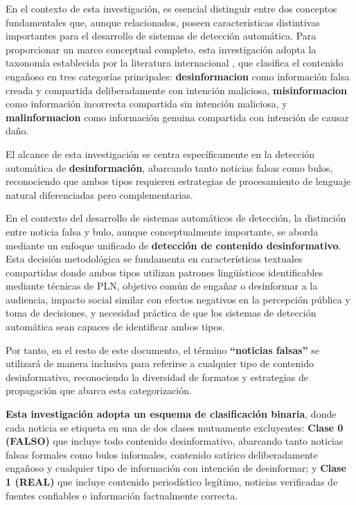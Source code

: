 En el contexto de esta investigación, es esencial distinguir entre dos conceptos fundamentales que, aunque relacionados, poseen características distintivas importantes para el desarrollo de sistemas de detección automática. Para proporcionar un marco conceptual completo, esta investigación adopta la taxonomía establecida por la literatura internacional \cite{bondielli2019survey, hu2022deep}, que clasifica el contenido engañoso en tres categorías principales: \textbf{\gls{desinformacion}} como información falsa creada y compartida deliberadamente con intención maliciosa, \textbf{\gls{misinformacion}} como información incorrecta compartida sin intención maliciosa, y \textbf{\gls{malinformacion}} como información genuina compartida con intención de causar daño.

El alcance de esta investigación se centra específicamente en la detección automática de \textbf{desinformación}, abarcando tanto noticias falsas como bulos, reconociendo que ambos tipos requieren estrategias de procesamiento de lenguaje natural diferenciadas pero complementarias.

En el contexto del desarrollo de sistemas automáticos de detección, la distinción entre noticia falsa y bulo, aunque conceptualmente importante, se aborda mediante un enfoque unificado de \textbf{detección de contenido desinformativo}. Esta decisión metodológica se fundamenta en características textuales compartidas donde ambos tipos utilizan patrones lingüísticos identificables mediante técnicas de PLN, objetivo común de engañar o desinformar a la audiencia, impacto social similar con efectos negativos en la percepción pública y toma de decisiones, y necesidad práctica de que los sistemas de detección automática sean capaces de identificar ambos tipos.

Por tanto, en el resto de este documento, el término \textbf{``noticias falsas''} se utilizará de manera inclusiva para referirse a cualquier tipo de contenido desinformativo, reconociendo la diversidad de formatos y estrategias de propagación que abarca esta categorización.

\textbf{Esta investigación adopta un esquema de clasificación binaria}, donde cada noticia se etiqueta en una de dos clases mutuamente excluyentes: \textbf{Clase 0 (FALSO)} que incluye todo contenido desinformativo, abarcando tanto noticias falsas formales como bulos informales, contenido satírico deliberadamente engañoso y cualquier tipo de información con intención de desinformar; y \textbf{Clase 1 (REAL)} que incluye contenido periodístico legítimo, noticias verificadas de fuentes confiables e información factualmente correcta.

